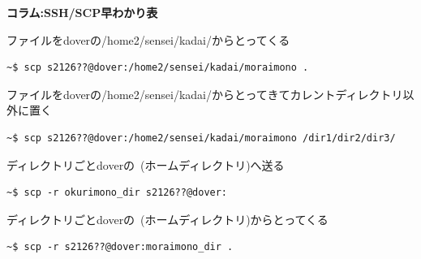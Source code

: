 \documentclass[a4j]{ltjsreport}
\begin{document}
\begin{itembox}[l]{\textbf{コラム:SSH/SCP早わかり表}}
\begin{itemize}
            ファイルをdoverの/home2/sensei/kadai/からとってくる
            \begin{lstlisting}[numbers=none]
    ~$ scp s2126??@dover:/home2/sensei/kadai/moraimono .
            \end{lstlisting}
            ファイルをdoverの/home2/sensei/kadai/からとってきてカレントディレクトリ以外に置く
            \begin{lstlisting}[numbers=none]
    ~$ scp s2126??@dover:/home2/sensei/kadai/moraimono /dir1/dir2/dir3/
            \end{lstlisting}
            ディレクトリごとdoverの~(ホームディレクトリ)へ送る
            \begin{lstlisting}[numbers=none]
    ~$ scp -r okurimono_dir s2126??@dover:
            \end{lstlisting}
            ディレクトリごとdoverの~(ホームディレクトリ)からとってくる
            \begin{lstlisting}[numbers=none]
    ~$ scp -r s2126??@dover:moraimono_dir .
            \end{lstlisting}
        \end{itemize}
    \end{itembox}
\end{document}
